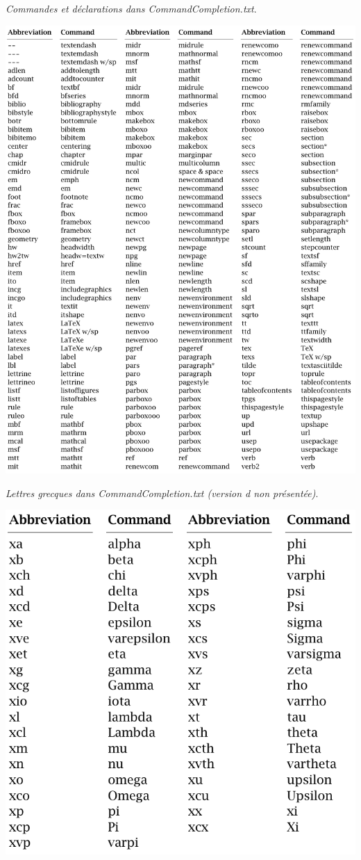 \documentclass[12pt,french]{article}
\newcommand{\fontelatex}{\ttfamily}
\newcommand{\argument}[1]{{\fontelatex#1}}
\begin{document}
\begin{table}[htbp]
\centering
\hspace{-1cm}
\begin{minipage}{\textwidth}%
\caption{\emph{Commandes et déclarations dans \textsf{CommandCompletion.txt}}.}
\includegraphics[scale=.74]{tbl2}
\label{tbl2}
\end{minipage}
\end{table}

\begin{table}[htbp]
\centering
\caption{\emph{Lettres grecques dans \textsf{CommandCompletion.txt} (version \argument{d} non présentée)}.}
\includegraphics[scale=.74]{tbl3}
\label{tbl3}
\end{table}
\end{document}

